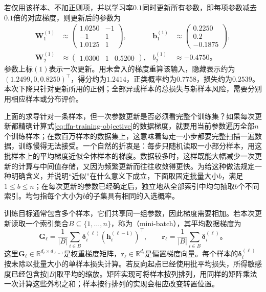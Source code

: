 \begin{example}[一次前向与反向计算]
  若仅用该样本、不加正则项，并以学习率$0.1$同时更新所有参数，即每项参数减去$0.1$倍的对应梯度，则更新后的参数为
  \[
    \begin{aligned}
      \bm{W}_1^{(1)}&\approx
        \begin{pmatrix}1.0250&-1\\-1&1\\1.0125&1\end{pmatrix},
      &\bm{b}_1^{(1)}&\approx
        \begin{pmatrix}0.2250\\0.2\\-0.1875\end{pmatrix},\\
      \bm{W}_2^{(1)}&\approx\begin{pmatrix}1.0300&1&0.5200\end{pmatrix},
      &b_2^{(1)}&\approx-0.4750\text{。}
    \end{aligned}
  \]
  参数上标$(1)$表示一次更新。用未舍入的梯度重算该输入，隐藏表示约为$(1.2499,0,0.8250)^{\top}$，得分约为$1.2414$，正类概率约为$0.7758$，损失约为$0.2539$。本次下降只针对更新所用的正例；全部异或样本的总损失与新样本风险，需要分别用相应样本或分布评价。
\end{example}

上面的求导针对一条样本，但一次参数更新是否必须看完整个训练集？如果每次更新都精确计算式\eqref{eq:ffn-training-objective}的数据梯度，就要用当前参数遍历全部$n$个训练样本；在数百万样本的数据集上，这意味着每走一小步都要完整扫描一遍数据，训练慢得无法接受。一个自然的折衷是：每步只随机读取一小部分样本，用这批样本上的平均梯度近似全体样本的梯度。数据较多时，这样既能大幅减少一次更新的计算与中间值存储，又因为频繁更新而往往收敛得更快。为给这种做法规定一种明确含义，并说明“近似”在什么意义下成立，下面取固定批量大小$b$，满足$1\leq b\leq n$；在每次更新的参数已经确定后，独立地从全部索引中均匀抽取$b$个不同索引。均匀指每个大小为$b$的子集具有相同的入选概率。

训练目标通常包含多个样本，它们共享同一组参数，因此梯度需要相加。若本次更新读取一个索引集合$B\subseteq\{1,\ldots,n\}$，称为（mini-batch），其平均数据梯度为
\begin{equation}
  \bm{G}_\ell=
  \frac1{|B|}\sum_{i\in B}
  \bm{\delta}_i^{(\ell)}(\bm{h}_i^{(\ell-1)})^{\top},
  \qquad
  \bm{r}_\ell=
  \frac1{|B|}\sum_{i\in B}\bm{\delta}_i^{(\ell)}\text{。}
  \label{eq:ffn-minibatch-gradients}
\end{equation}
这里$\bm{G}_\ell\in\mathbb R^{d_\ell\times d_{\ell-1}}$是权重梯度矩阵，$\bm{r}_\ell\in\mathbb R^{d_\ell}$是偏置梯度向量。每个样本的$\bm{\delta}_i^{(\ell)}$按未除以批量大小的单样本损失计算。若反向起点已经使用批平均损失，所得敏感度已经包含按$|B|$取平均的缩放。矩阵实现可将样本按列排列，用同样的矩阵乘法一次计算这些外积之和；样本按行排列的实现会相应改变转置位置。

